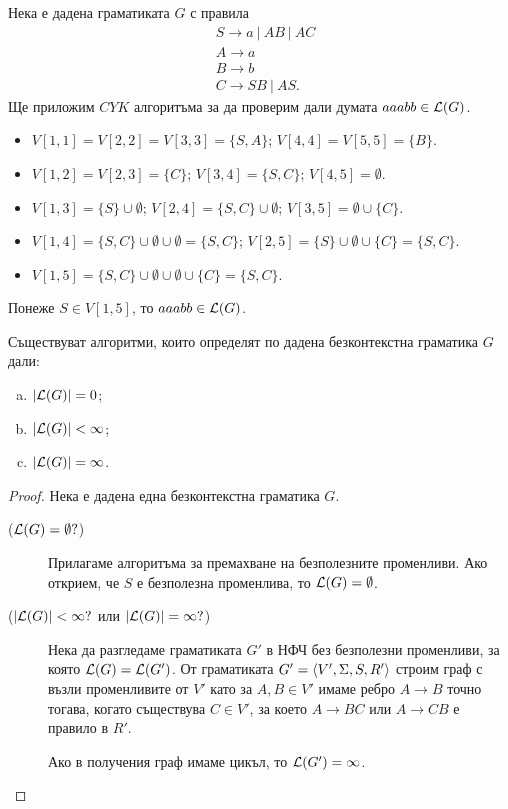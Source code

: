 \begin{example}
  Нека е дадена граматиката $G$ с правила 
  \begin{align*}
    & S\rightarrow a\ |\ AB\ |\ AC\\
    & A\rightarrow a\\
    & B\rightarrow b\\
    & C\rightarrow SB\ |\ AS.
  \end{align*}
  Ще приложим $CYK$ алгоритъма за да проверим дали думата $aaabb \in \mathcal{L}(G)$.
  \begin{itemize}
  \item 
    $V[1,1] = V[2,2] = V[3,3] = \{S,A\}$;
    $V[4,4] = V[5,5] = \{B\}$.
  \item
    $V[1,2] = V[2,3] = \{C\}$;
    $V[3,4] = \{S,C\}$;
    $V[4,5] = \emptyset$.
  \item
    $V[1,3] = \{S\} \cup \emptyset$;
    $V[2,4] = \{S,C\} \cup \emptyset$;
    $V[3,5] = \emptyset \cup \{C\}$.
  \item
    $V[1,4] = \{S,C\} \cup \emptyset \cup \emptyset = \{S,C\}$;
    $V[2,5] = \{S\} \cup \emptyset \cup \{C\} = \{S,C\}$.
  \item
    $V[1,5] = \{S,C\} \cup \emptyset \cup \emptyset \cup \{C\}= \{S,C\}$.
  \end{itemize}
  Понеже $S \in V[1,5]$, то $aaabb \in \mathcal{L}(G)$.
\end{example}

\begin{thm}
  Съществуват алгоритми, които определят по дадена безконтекстна граматика $G$ дали:
  \begin{enumerate}[a)]
  \item 
    $\lvert{\mathcal{L}(G)}\rvert = 0$;
  \item
    $\lvert{\mathcal{L}(G)}\rvert < \infty$;
  \item
    $\lvert{\mathcal{L}(G)}\rvert = \infty$.
  \end{enumerate}
\end{thm}
\begin{proof}
  Нека е дадена една безконтекстна граматика $G$.
  \begin{description}
  \item[($\mathcal{L}(G) = \emptyset?$)]
    Прилагаме алгоритъма за премахване на безполезните променливи.
    Ако открием, че $S$ е безполезна променлива, то $\mathcal{L}(G) = \emptyset$.
  \item[($\lvert{\mathcal{L}(G)}\rvert < \infty?$ или $\lvert{\mathcal{L}(G)}\rvert = \infty?$)]
    Нека да разгледаме граматиката $G'$ в НФЧ без безполезни променливи, за която $\mathcal{L}(G) = \mathcal{L}(G')$.
    От граматиката $G' = \langle{V',\Sigma,S,R'}\rangle$ строим граф с възли променливите от $V'$ като
    за $A,B \in V'$ имаме ребро $A \to B$ точно тогава, когато съществува $C \in V'$,
    за което $A \to BC$ или $A \to CB$ е правило в $R'$.
    
    Ако в получения граф имаме цикъл, то $\mathcal{L}(G') = \infty$.
  \end{description}
\end{proof}

